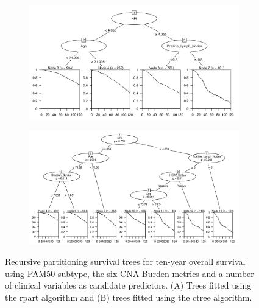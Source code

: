 \begin{figure}[!htb]
\centering

\vspace{1cm}

\begin{subfigure}{\textwidth}
\subcaption{}
\includegraphics[width=1\textwidth]{../figures/Appendices/Appendix_B/Clin_PartyKit_Survival_Burden_TenYearOS_PAM50.png}
\end{subfigure}

\vspace{2cm}

\begin{subfigure}{\textwidth}
\subcaption{}
\includegraphics[width=1\textwidth]{../figures/Appendices/Appendix_B/Clin_Ctree_Survival_Burden_TenYearOS_PAM50.png}
\end{subfigure}

\vspace{1cm}

\caption[Recursive partitioning survival trees for ten-year overall survival using PAM50 subtype, the six CNA Burden metrics and a number of clinical variables as candidate predictors.]{Recursive partitioning survival trees for ten-year overall survival using PAM50 subtype, the six CNA Burden metrics and a number of clinical variables as candidate predictors. (A) Trees fitted using the rpart algorithm and (B) trees fitted using the ctree algorithm.}
\end{figure}

